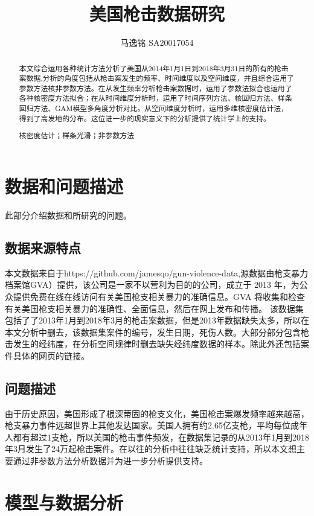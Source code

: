 \documentclass[12pt]{ctexart}
\title{美国枪击数据研究}
\author{马逸铭  SA20017054}
\date{}
\begin{document}
\maketitle

\begin{abstract}
 本文综合运用各种统计方法分析了美国从2014年1月1日到2018年3月31日的所有的枪击案数据,分析的角度包括从枪击案发生的频率、时间维度以及空间维度，并且综合运用了参数方法核非参数方法。在从发生频率分析枪击案数据时，运用了参数法拟合也运用了各种核密度方法拟合；在从时间维度分析时，运用了时间序列方法、核回归方法、样条回归方法、GAM模型多角度分析对比。从空间维度分析时，运用多维核密度估计法，得到了高发地的分布。这位进一步的现实意义下的分析提供了统计学上的支持。

 核密度估计；样条光滑；非参数方法

\end{abstract}





\section{数据和问题描述}
此部分介绍数据和所研究的问题。
\subsection{数据来源特点}
本文数据来自于https://github.com/jamesqo/gun-violence-data,源数据由枪支暴力档案馆GVA）提供，该公司是一家不以营利为目的的公司，成立于 2013 年，为公众提供免费在线在线访问有关美国枪支相关暴力的准确信息。GVA 将收集和检查有关美国枪支相关暴力的准确性、全面信息，然后在网上发布和传播。
该数据集包括了了2013年1月到2018年3月的枪击案数据，但是2013年数据缺失太多，所以在本文分析中删去，该数据集案件的编号，发生日期，死伤人数。大部分部分包含枪击发生的经纬度，在分析空间规律时删去缺失经纬度数据的样本。除此外还包括案件具体的网页的链接。

\subsection{问题描述}
由于历史原因，美国形成了根深蒂固的枪支文化，美国枪击案爆发频率越来越高，枪支暴力事件远超世界上其他发达国家。美国人拥有约2.65亿支枪，平均每位成年人都有超过1支枪，所以美国的枪击事件频发，在数据集记录的从2013年1月到2018年3月发生了24万起枪击案件。在以往的分析中往往缺乏统计支持，所以本文想主要通过非参数方法分析数据并为进一步分析提供支持。


\section{模型与数据分析}
\end{document}
